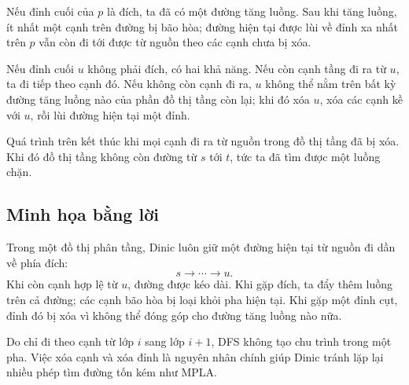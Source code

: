 \documentclass[11pt]{article}
\begin{document}
Nếu đỉnh cuối của \(p\) là đích, ta đã có một đường tăng luồng. Sau khi tăng
luồng, ít nhất một cạnh trên đường bị bão hòa; đường hiện tại được lùi về đỉnh
xa nhất trên \(p\) vẫn còn đi tới được từ nguồn theo các cạnh chưa bị xóa.

Nếu đỉnh cuối \(u\) không phải đích, có hai khả năng. Nếu còn cạnh tầng đi ra
từ \(u\), ta đi tiếp theo cạnh đó. Nếu không còn cạnh đi ra, \(u\) không thể
nằm trên bất kỳ đường tăng luồng nào của phần đồ thị tầng còn lại; khi đó xóa
\(u\), xóa các cạnh kề với \(u\), rồi lùi đường hiện tại một đỉnh.

Quá trình trên kết thúc khi mọi cạnh đi ra từ nguồn trong đồ thị tầng đã bị
xóa. Khi đó đồ thị tầng không còn đường từ \(s\) tới \(t\), tức ta đã tìm được
một luồng chặn.

\subsection{Minh họa bằng lời}

Trong một đồ thị phân tầng, Dinic luôn giữ một đường hiện tại từ nguồn đi dần
về phía đích:
\[
  s \longrightarrow \cdots \longrightarrow u.
\]
Khi còn cạnh hợp lệ từ \(u\), đường được kéo dài. Khi gặp đích, ta đẩy thêm
luồng trên cả đường; các cạnh bão hòa bị loại khỏi pha hiện tại. Khi gặp một
đỉnh cụt, đỉnh đó bị xóa vì không thể đóng góp cho đường tăng luồng nào nữa.

Do chỉ đi theo cạnh từ lớp \(i\) sang lớp \(i+1\), DFS không tạo chu trình
trong một pha. Việc xóa cạnh và xóa đỉnh là nguyên nhân chính giúp Dinic tránh
lặp lại nhiều phép tìm đường tốn kém như MPLA.
\end{document}
